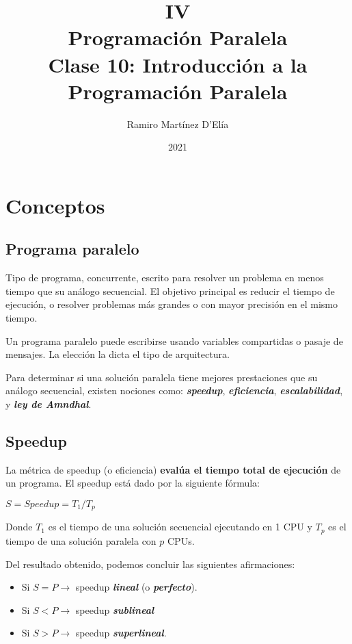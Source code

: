 \documentclass[a4paper, 10pt]{report}
\begin{document}
\title{
    IV\\
    Programación Paralela\\
    \large Clase 10: Introducción a la Programación Paralela
}
\author{Ramiro Martínez D'Elía}
\date{2021}
\maketitle

\tableofcontents

\chapter{Conceptos}

\section{Programa paralelo}

Tipo de programa, concurrente, escrito para resolver un problema en menos tiempo que su análogo secuencial. El objetivo principal es reducir el tiempo de ejecución, o resolver problemas más grandes o con mayor precisión en el mismo tiempo.

Un programa paralelo puede escribirse usando variables compartidas o pasaje de mensajes. La elección la dicta el tipo de arquitectura.

Para determinar si una solución paralela tiene mejores prestaciones que su análogo secuencial, existen nociones como: \textbf{\emph{speedup}}, \textbf{\emph{eficiencia}}, \textbf{\emph{escalabilidad}}, y \textbf{\emph{ley de Amndhal}}.

\section{Speedup}

La métrica de speedup (o eficiencia) \textbf{evalúa el tiempo total de ejecución} de un programa. El speedup está dado por la siguiente fórmula:

\begin{center}
$S = Speedup = T_1 / T_p$
\end{center}

Donde $T_1$ es el tiempo de una solución secuencial ejecutando en 1 CPU y $T_p$ es el tiempo de una solución paralela con $p$ CPUs. 

Del resultado obtenido, podemos concluir las siguientes afirmaciones:

\begin{itemize}
    \item Si $S = P \rightarrow $ speedup \textbf{\emph{lineal}} (o \textbf{\emph{perfecto}}).
    \item Si $S < P \rightarrow $ speedup \textbf{\emph{sublineal}}
    \item Si $S > P \rightarrow $ speedup \textbf{\emph{superlineal}}.
\end{itemize}
\end{document}

